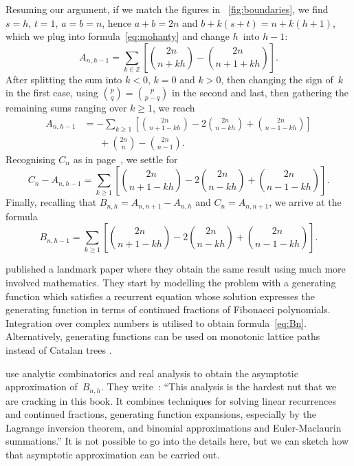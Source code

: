 Resuming our argument, if we match the figures in
\fig~\ref{fig:boundaries}, we find \(s=h\), \(t=1\), \(a=b=n\),
hence \(a+b=2n\) and \(b+k(s+t)=n+k(h+1)\),
which we plug into formula~\eqref{eq:mohanty} and change \(h\)~into \(h-1\):
\begin{equation*}
A_{n,h-1} = \sum_{k \in \mathbb{Z}}\left[\binom{2n}{n+kh} -
           \binom{2n}{n+1+kh}\right].
\end{equation*}
After splitting the sum into \(k<0\), \(k=0\) and \(k>0\), then
changing the sign of~\(k\) in the first case, using \(\binom{p}{q} =
\binom{p}{p-q}\) in the second and last, then gathering the remaining
sums ranging over \(k \geqslant 1\), we reach
\begin{align*}
A_{n,h-1}
  &= - \sum_{k \geqslant 1}\left[\binom{2n}{n+1-kh} -
    2\binom{2n}{n-kh} + \binom{2n}{n-1-kh}\right]\\
  &\phantom{=}\; + \binom{2n}{n} - \binom{2n}{n-1}.
\end{align*}
Recognising \(C_n\) as in page~\pageref{eq:Ann}, we settle for
\begin{equation*}
C_n - A_{n,h-1}
  = \sum_{k \geqslant 1}\left[\binom{2n}{n+1-kh} -
    2\binom{2n}{n-kh} + \binom{2n}{n-1-kh}\right].
\end{equation*}
Finally, recalling that \(B_{n,h} = A_{n,n+1} - A_{n,h}\) and \(C_n =
A_{n,n+1}\), we arrive at the formula
\begin{equation}
B_{n,h-1} = \sum_{k \geqslant 1}
            \left[\binom{2n}{n+1-kh} - 2\binom{2n}{n-kh}
            + \binom{2n}{n-1-kh}\right].
\label{eq:Bn}
\end{equation}

\citet*{KnuthdeBruijnRice_1972} published a landmark paper where they
obtain the same result using much more involved mathematics. They
start by modelling the problem with a generating function
\citep{Wilf_1990} which satisfies a recurrent equation whose solution
expresses the generating function in terms of continued fractions of
Fibonacci polynomials. Integration over complex numbers is utilised to
obtain formula~\eqref{eq:Bn}. Alternatively, generating functions can
be used on monotonic lattice paths instead of Catalan trees
\citep[page~64]{Kemp_1984} \citep{FlajoletNebelProdinger_2006}.

\citet*{SedgewickFlajolet_1996} \citep{FlajoletSedgewick_2009} use
analytic combinatorics and real analysis to obtain the asymptotic
approximation of~\(B_{n,h}\). They
write~\cite[p.~260]{SedgewickFlajolet_1996}: ``This analysis is the
hardest nut that we are cracking in this book. It combines techniques
for solving linear recurrences and continued fractions, generating
function expansions, especially by the Lagrange inversion theorem, and
binomial approximations and Euler\--Maclaurin summations.'' It is not
possible to go into the details here, but we can sketch how that
asymptotic approximation can be carried out.

